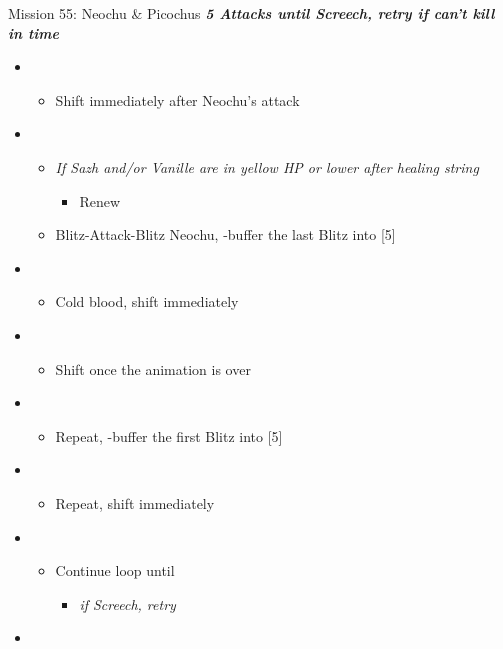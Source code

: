 \begin{battle}{Mission 55: Neochu \& Picochus}
	\textit{\textbf{5 Attacks until Screech, retry if can't kill in time}}
	\begin{itemize}
		\item \fourth
			\begin{itemize}
				\item Shift immediately after Neochu's attack
			\end{itemize}
		\item \first
			\begin{itemize}
				\item \textit{If Sazh and/or Vanille are in yellow HP or lower after healing string}
					\begin{itemize}
						\item Renew
					\end{itemize}
				\item Blitz-Attack-Blitz Neochu, \rav-buffer the last Blitz into [5]
			\end{itemize}
		\item \fifth
			\begin{itemize}
				\item Cold blood, shift immediately
			\end{itemize}		
		\item \third
			\begin{itemize}
				\item Shift once the animation is over
			\end{itemize}		
		\item \first
			\begin{itemize}
				\item Repeat, \rav-buffer the first Blitz into [5]
			\end{itemize}		
		\item \fifth
			\begin{itemize}
				\item Repeat, shift immediately
			\end{itemize}		
		\item \third
			\begin{itemize}
				\item Continue loop until \stagger
					\begin{itemize}
						\item \textit{if Screech, retry}
					\end{itemize}
			\end{itemize}		
		\item \second

\end{itemize}
\end{battle}
